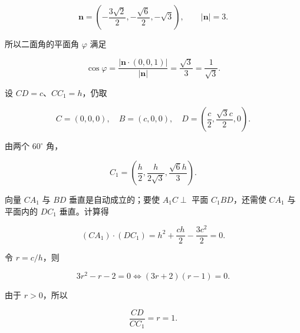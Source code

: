 \begin{answer}
\nopagebreak[4]
\[
\mathbf n=\left(-\frac{3\sqrt2}{2},-\frac{\sqrt6}{2},-\sqrt3\right),
\qquad |\mathbf n|=3.
\]

所以二面角的平面角 $\varphi$ 满足

\nopagebreak[4]
\[
\cos\varphi
=\frac{|\mathbf n\cdot(0,0,1)|}{|\mathbf n|}
=\frac{\sqrt3}{3}
=\frac1{\sqrt3}.
\]


设 $CD=c$、$CC_1=h$，仍取

\nopagebreak[4]
\[
C=(0,0,0),\quad B=(c,0,0),\quad D=\left(\frac c2,\frac{\sqrt3c}{2},0\right).
\]

由两个 $60^\circ$ 角，

\nopagebreak[4]
\[
C_1=\left(\frac h2,\frac h{2\sqrt3},\frac{\sqrt6h}{3}\right).
\]

向量 $CA_1$ 与 $BD$ 垂直是自动成立的；要使 $A_1C\perp$ 平面 $C_1BD$，还需使 $CA_1$ 与平面内的 $DC_1$ 垂直。计算得

\nopagebreak[4]
\[
(CA_1)\cdot(DC_1)
=h^2+\frac{ch}{2}-\frac{3c^2}{2}=0.
\]

令 $r=c/h$，则

\nopagebreak[4]
\[
3r^2-r-2=0
\Longleftrightarrow
(3r+2)(r-1)=0.
\]

由于 $r>0$，所以

\nopagebreak[4]
\[
\frac{CD}{CC_1}=r=1.
\]




\end{answer}
